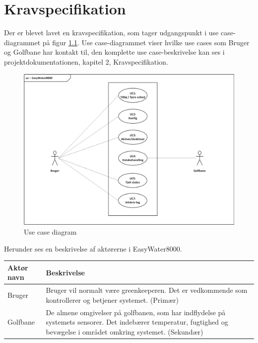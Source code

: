 \chapter{Kravspecifikation}

Der er blevet lavet en kravspecifikation, som tager udgangspunkt i use case-diagrammet på figur \ref{lab:usecasediagram}. Use case-diagrammet viser hvilke use cases som Bruger og Golfbane har kontakt til, den komplette use case-beskrivelse kan ses i projektdokumentationen, kapitel 2, Kravspecifikation. 

\begin{figure}[H] \centering
\vspace*{\fill}
\includegraphics[width=\textwidth]{Billeder/Usecase_Diagram}
\caption{Use case diagram}
\label{lab:usecasediagram}
\vspace*{\fill}
\end{figure}

Herunder ses en beskrivelse af aktørerne i EasyWater8000.

\begin{table}[!htbp] \centering
	\begin{tabular}{|p{2.5cm}|p{11.5cm}|}
	\hline
		\textbf{Aktør navn} & \textbf{Beskrivelse} \\\hline
		Bruger & Bruger vil normalt være greenkeeperen. Det er vedkommende som kontrollerer og betjener systemet. (Primær) \\\hline

		Golfbane & De almene omgivelser på golfbanen, som har indflydelse på systemets sensorer. Det indebærer temperatur, fugtighed og bevægelse i området omkring systemet. (Sekundær) \\\hline
	\end{tabular}
\end{table}

